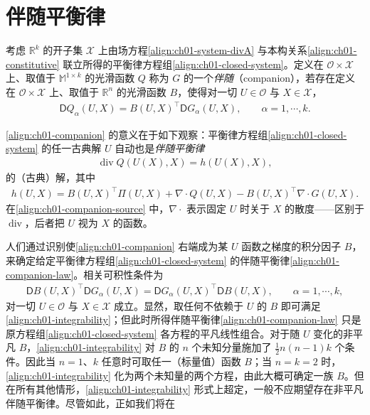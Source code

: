 \documentclass[../../main.tex]{subfiles}
\begin{document}
\section{伴随平衡律}\label{section:ch01-伴随平衡律}

考虑 $\mathbb{R}^{k}$ 的开子集 $\mathscr{X}$ 上由场方程\cref{align:ch01-system-divA} 与本构关系\cref{align:ch01-constitutive} 联立所得的平衡律方程组\cref{align:ch01-closed-system}。定义在 $\mathcal{O}\times\mathscr{X}$ 上、取值于 $\mathbb{M}^{1\times k}$ 的光滑函数 $Q$ 称为 $G$ 的一个\emph{伴随}（companion），若存在定义在 $\mathcal{O}\times\mathscr{X}$ 上、取值于 $\mathbb{R}^{n}$ 的光滑函数 $B$，使得对一切 $U\in\mathcal{O}$ 与 $X\in\mathscr{X}$，
\begin{align}
\mathsf{D}Q_{\alpha}(U,X)=B(U,X)^{\top}\mathsf{D}G_{\alpha}(U,X),\qquad \alpha=1,\cdots,k.\label{align:ch01-companion}
\end{align}

\cref{align:ch01-companion} 的意义在于如下观察：平衡律方程组\cref{align:ch01-closed-system} 的任一古典解 $U$ 自动也是\emph{伴随平衡律}
\begin{align}
\operatorname{div} Q(U(X),X)=h(U(X),X),\label{align:ch01-companion-law}
\end{align}
的（古典）解，其中
\begin{align}
h(U,X)=B(U,X)^{\top}\Pi(U,X)+\nabla\cdot Q(U,X)-B(U,X)^{\top}\nabla\cdot G(U,X).\label{align:ch01-companion-source}
\end{align}
在\cref{align:ch01-companion-source} 中，$\nabla\cdot$ 表示固定 $U$ 时关于 $X$ 的散度——区别于 $\operatorname{div}$，后者把 $U$ 视为 $X$ 的函数。

人们通过识别使\cref{align:ch01-companion} 右端成为某 $U$ 函数之梯度的积分因子 $B$，来确定给定平衡律方程组\cref{align:ch01-closed-system} 的伴随平衡律\cref{align:ch01-companion-law}。相关可积性条件为
\begin{align}
\mathsf{D}B(U,X)^{\top}\mathsf{D}G_{\alpha}(U,X)=\mathsf{D}G_{\alpha}(U,X)^{\top}\mathsf{D}B(U,X),\qquad \alpha=1,\cdots,k,\label{align:ch01-integrability}
\end{align}
对一切 $U\in\mathcal{O}$ 与 $X\in\mathscr{X}$ 成立。显然，取任何不依赖于 $U$ 的 $B$ 即可满足\cref{align:ch01-integrability}；但此时所得伴随平衡律\cref{align:ch01-companion-law} 只是原方程组\cref{align:ch01-closed-system} 各方程的平凡线性组合。对于随 $U$ 变化的非平凡 $B$，\cref{align:ch01-integrability} 对 $B$ 的 $n$ 个未知分量施加了 $\frac{1}{2}n(n-1)k$ 个条件。因此当 $n=1$、$k$ 任意时可取任一（标量值）函数 $B$；当 $n=k=2$ 时，\cref{align:ch01-integrability} 化为两个未知量的两个方程，由此大概可确定一族 $B$。但在所有其他情形，\cref{align:ch01-integrability} 形式上超定，一般不应期望存在非平凡伴随平衡律。尽管如此，正如我们将在%
\end{document}
